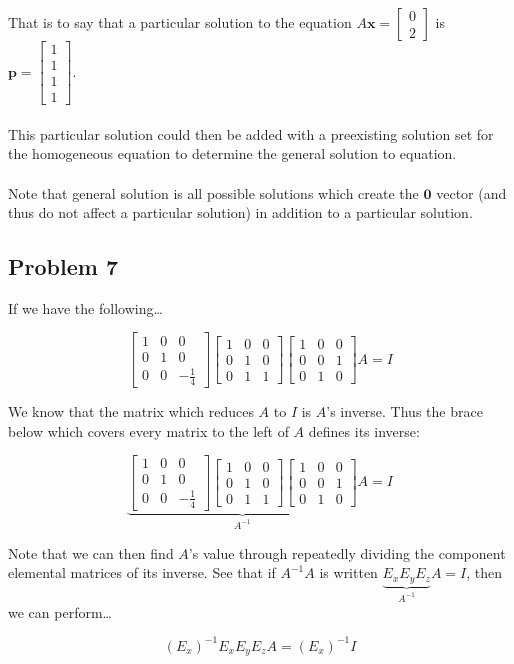 \documentclass[12pt]{article}
\newcommand{\bm}[1]{\mathbf{{#1}}}
\newcommand{\mb}{\begin{bmatrix}}
\newcommand{\me}{\end{bmatrix}}
\begin{document}
That is to say that a particular solution to the equation $A\bm{x} = \mb 0 \\ 2 \me$ is $\bm{p} = \mb 1\\1\\1\\1 \me$. \\ \\

This particular solution could then be added with a preexisting solution set for the homogeneous equation to determine the general solution to equation. \\ \\

Note that general solution is all possible solutions which create the $\bm{0}$ vector (and thus do not affect a particular solution) in addition to a particular solution.

\subsection*{Problem 7}

If we have the following\dots

$$\mb
1 & 0 & 0 \\
0 & 1 & 0 \\
0 & 0 & -\frac{1}{4}
\me \mb
1 & 0 & 0 \\
0 & 1 & 0 \\
0 & 1 & 1
\me \mb
1 & 0 & 0 \\
0 & 0 & 1 \\
0 & 1 & 0 
\me A = I
$$

We know that the matrix which reduces $A$ to $I$ is $A$'s inverse. 
Thus the brace below which covers every matrix to the left of $A$ defines its inverse:

$$\underbrace{\mb
1 & 0 & 0 \\
0 & 1 & 0 \\
0 & 0 & -\frac{1}{4}
\me \mb
1 & 0 & 0 \\
0 & 1 & 0 \\
0 & 1 & 1
\me \mb
1 & 0 & 0 \\
0 & 0 & 1 \\
0 & 1 & 0 
\me}_{A^{-1}} A = I
$$

Note that we can then find $A$'s value through repeatedly dividing the component elemental
matrices of its inverse. See that if $A^{-1}A$ is written $\underbrace{E_x E_y E_z}_{A^{-1}} A = I$, then we can perform\dots

$$(E_x)^{-1}E_x E_y E_z A = (E_x)^{-1}I $$
\end{document}
